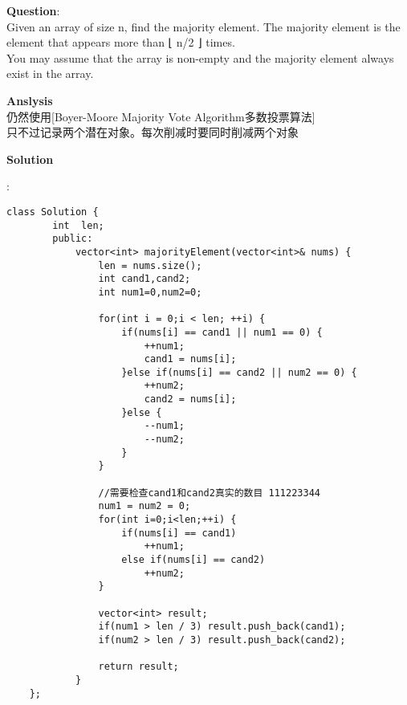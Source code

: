     
\begin{description}
    \item{\textbf{Question}}:\\%
		Given an array of size n, find the majority element. The majority element is the element that appears more than ⌊ n/2 ⌋ times.\\
		You may assume that the array is non-empty and the majority element always exist in the array.\\

    \item{\textbf{Anslysis}}\\
		仍然使用[Boyer-Moore Majority Vote Algorithm多数投票算法]\\
		只不过记录两个潜在对象。每次削减时要同时削减两个对象\\

    \item{\textbf{Solution}}\\
	\item{} : \\
		\begin{lstlisting}
class Solution {
    	int  len;
    	public:
    		vector<int> majorityElement(vector<int>& nums) {
    			len = nums.size();
    			int cand1,cand2;
    			int num1=0,num2=0;
    
    			for(int i = 0;i < len; ++i) {
    				if(nums[i] == cand1 || num1 == 0) {
    					++num1;
    					cand1 = nums[i];
    				}else if(nums[i] == cand2 || num2 == 0) {
    					++num2;
    					cand2 = nums[i];
    				}else {
    					--num1;		
    					--num2;
    				}
    			}
    
    			//需要检查cand1和cand2真实的数目 111223344
    			num1 = num2 = 0;
    			for(int i=0;i<len;++i) {
    				if(nums[i] == cand1)
    					++num1;
    				else if(nums[i] == cand2)
    					++num2;
    			}
    
    			vector<int> result;
    			if(num1 > len / 3) result.push_back(cand1);
    			if(num2 > len / 3) result.push_back(cand2);
    
    			return result;
    		}
    };
		\end{lstlisting}

\end{description}

